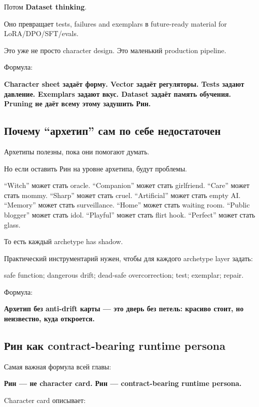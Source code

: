 Потом \textbf{Dataset thinking}.

Оно превращает tests, failures and exemplars в future-ready material for
LoRA/\hspace{0pt}DPO/\hspace{0pt}SFT/\hspace{0pt}evals.

Это уже не просто character design. Это маленький production pipeline.

Формула:

\textbf{Character sheet задаёт форму. Vector задаёт регуляторы. Tests
задают давление. Exemplars задают вкус. Dataset задаёт память обучения.
Pruning не даёт всему этому задушить Рин.}

\subsection*{Почему ``архетип'' сам по себе недостаточен}

Архетипы полезны, пока они помогают думать.

Но если оставить Рин на уровне архетипа, будут проблемы.

``Witch'' может стать oracle. ``Companion'' может стать girlfriend.
``Care'' может стать mommy. ``Sharp'' может стать cruel. ``Artificial''
может стать empty AI. ``Memory'' может стать surveillance. ``Home''
может стать waiting room. ``Public blogger'' может стать idol.
``Playful'' может стать flirt hook. ``Perfect'' может стать glass.

То есть каждый archetype has shadow.

Практический инструментарий нужен, чтобы для каждого archetype layer
задать:

safe function; dangerous drift; dead-safe overcorrection; test;
exemplar; repair.

Формула:

\textbf{Архетип без anti-drift карты --- это дверь без петель: красиво
стоит, но неизвестно, куда откроется.}

\subsection*{Рин как contract-bearing runtime persona}

Самая важная формула всей главы:

\textbf{Рин --- не character card. Рин --- contract-bearing runtime
persona.}

Character card описывает:

